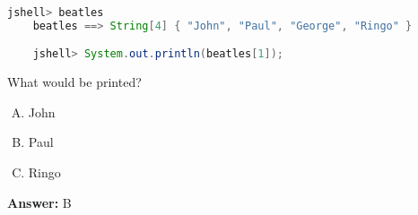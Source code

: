 \documentclass[12pt]{article}
\begin{document}
\begin{enumerate}[1.]
    \begin{lstlisting}[language=Java]
    jshell> beatles
    beatles ==> String[4] { "John", "Paul", "George", "Ringo" }

    jshell> System.out.println(beatles[1]);
    \end{lstlisting}

    What would be printed?

    \bigskip

    \begin{enumerate}[A.]
        \item John
        \item Paul
        \item Ringo
    \end{enumerate}

    \bigskip

    \textbf{Answer:} B

\end{enumerate}
\end{document}
